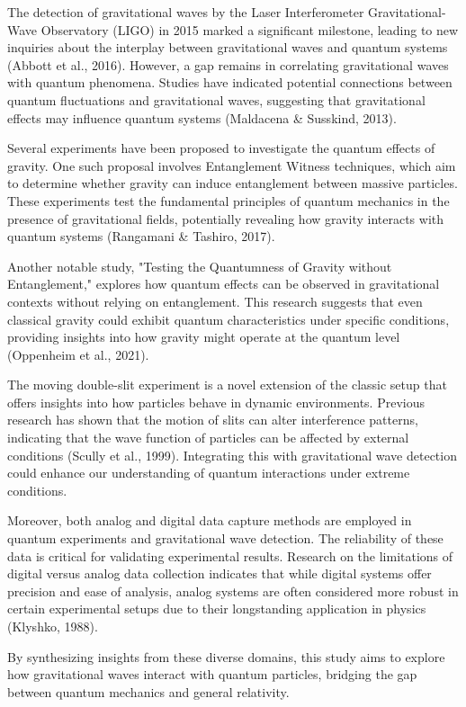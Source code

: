 \documentclass{article}
\begin{document}
The detection of gravitational waves by the Laser Interferometer Gravitational-Wave Observatory (LIGO) in 2015 marked a significant milestone, leading to new inquiries about the interplay between gravitational waves and quantum systems (Abbott et al., 2016). However, a gap remains in correlating gravitational waves with quantum phenomena. Studies have indicated potential connections between quantum fluctuations and gravitational waves, suggesting that gravitational effects may influence quantum systems (Maldacena \& Susskind, 2013).

Several experiments have been proposed to investigate the quantum effects of gravity. One such proposal involves Entanglement Witness techniques, which aim to determine whether gravity can induce entanglement between massive particles. These experiments test the fundamental principles of quantum mechanics in the presence of gravitational fields, potentially revealing how gravity interacts with quantum systems (Rangamani \& Tashiro, 2017).

Another notable study, "Testing the Quantumness of Gravity without Entanglement," explores how quantum effects can be observed in gravitational contexts without relying on entanglement. This research suggests that even classical gravity could exhibit quantum characteristics under specific conditions, providing insights into how gravity might operate at the quantum level (Oppenheim et al., 2021).

The moving double-slit experiment is a novel extension of the classic setup that offers insights into how particles behave in dynamic environments. Previous research has shown that the motion of slits can alter interference patterns, indicating that the wave function of particles can be affected by external conditions (Scully et al., 1999). Integrating this with gravitational wave detection could enhance our understanding of quantum interactions under extreme conditions.

Moreover, both analog and digital data capture methods are employed in quantum experiments and gravitational wave detection. The reliability of these data is critical for validating experimental results. Research on the limitations of digital versus analog data collection indicates that while digital systems offer precision and ease of analysis, analog systems are often considered more robust in certain experimental setups due to their longstanding application in physics (Klyshko, 1988).

By synthesizing insights from these diverse domains, this study aims to explore how gravitational waves interact with quantum particles, bridging the gap between quantum mechanics and general relativity.
\end{document}
